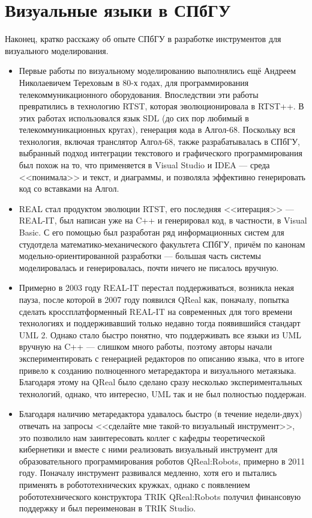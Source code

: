 \documentclass{text-style}
\begin{document}

\section{Визуальные языки в СПбГУ}

Наконец, кратко расскажу об опыте СПбГУ в разработке инструментов для визуального моделирования.

\begin{itemize}
    \item Первые работы по визуальному моделированию выполнялись ещё Андреем Николаевичем Тереховым в 80-х годах, для программирования телекоммуникационного оборудования. Впоследствии эти работы превратились в технологию RTST, которая эволюционировала в RTST++. В этих работах использовался язык SDL (до сих пор любимый в телекоммуникационных кругах), генерация кода в Алгол-68. Поскольку вся технология, включая транслятор Алгол-68, также разрабатывалась в СПбГУ, выбранный подход интеграции текстового и графического программирования был похож на то, что применяется в Visual Studio и IDEA --- среда <<понимала>> и текст, и диаграммы, и позволяла эффективно генерировать код со вставками на Алгол. 
    \item REAL стал продуктом эволюции RTST, его последняя <<итерация>> --- REAL-IT, был написан уже на C++ и генерировал код, в частности, в Visual Basic. С его помощью был разработан ряд информационных систем для студотдела математико-механического факультета СПбГУ, причём по канонам модельно-ориентированной разработки --- большая часть системы моделировалась и генерировалась, почти ничего не писалось вручную.
    \item Примерно в 2003 году REAL-IT перестал поддерживаться, возникла некая пауза, после которой в 2007 году появился QReal как, поначалу, попытка сделать кроссплатформенный REAL-IT на современных для того времени технологиях и поддерживавший только недавно тогда появившийся стандарт UML 2. Однако стало быстро понятно, что поддерживать все языки из UML вручную на C++ --- слишком много работы, поэтому авторы начали экспериментировать с генерацией редакторов по описанию языка, что в итоге привело к созданию полноценного метаредактора и визуального метаязыка. Благодаря этому на QReal было сделано сразу несколько экспериментальных технологий, однако, что интересно, UML так и не был полностью поддержан.
    \item Благодаря наличию метаредактора удавалось быстро (в течение недели-двух) отвечать на запросы <<сделайте мне такой-то визуальный инструмент>>, это позволило нам заинтересовать коллег с кафедры теоретической кибернетики и вместе с ними реализовать визуальный инструмент для образовательного программирования роботов QReal:Robots, примерно в 2011 году. Поначалу инструмент развивался медленно, хотя его и пытались применять в робототехнических кружках, однако с появлением робототехнического конструктора TRIK QReal:Robots получил финансовую поддержку и был переименован в TRIK Studio. 

\end{itemize}
\end{document}
